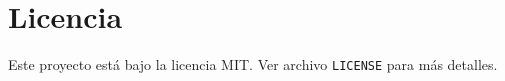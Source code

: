 \section{Licencia}

Este proyecto está bajo la licencia MIT. Ver archivo \texttt{LICENSE} para más detalles.